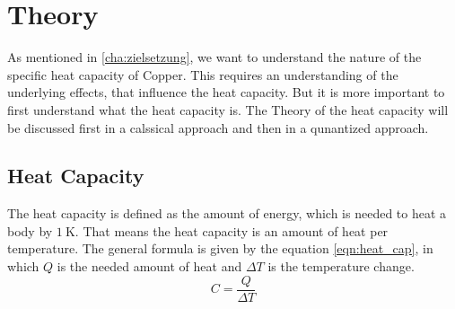 \chapter{Theory}
\label{cha:theory}
As mentioned in \autoref{cha:zielsetzung}, we want to understand the nature of the specific heat capacity of Copper. This requires an understanding of the underlying effects, that
influence the heat capacity. But it is more important to first understand what the heat capacity is. The Theory of the heat capacity will be discussed first in a calssical approach
and then in a qunantized approach. %
\section{Heat Capacity}
\label{sec:heat_capacity}
The heat capacity is defined as the amount of energy, which is needed to heat a body by $\qty{1}{\kelvin}$. That means the heat capacity is an amount of heat per temperature. The 
general formula is given by the equation \ref{eqn:heat_cap}, in which $Q$ is the needed amount of heat and $\Delta T$ is the temperature change.
\begin{equation}
    \label{eqn:heat_cap}
    C = \frac{Q}{\Delta T}
\end{equation} 